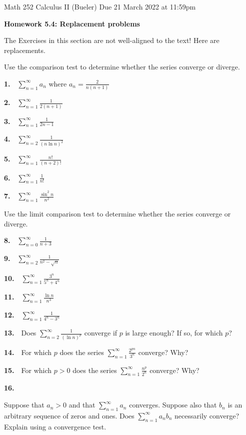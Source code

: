 \documentclass[12pt]{amsart}
\newcommand{\ds}{\displaystyle}
\begin{document}
\scriptsize \noindent Math 252 Calculus II (Bueler) \hfill Due 21 March 2022 at 11:59pm
\normalsize

\Large
\bigskip
\centerline{\textbf{Homework 5.4: Replacement problems}}
\medskip
\normalsize

\thispagestyle{empty}

\bigskip

The Exercises in this section are not well-aligned to the text!  Here are replacements.

\bigskip
\noindent Use the comparison test to determine whether the series converge or diverge.

\newcommand{\pr}[1]{\bigskip \textbf{#1.} \,\,}

\pr{1} $\ds \sum_{n=1}^\infty a_n$ where $\ds a_n = \frac{2}{n(n+1)}$

\pr{2} $\ds \sum_{n=1}^\infty \frac{1}{2(n+1)}$

\pr{3} $\ds \sum_{n=1}^\infty \frac{1}{2n - 1}$

\pr{4} $\ds \sum_{n=2}^\infty \frac{1}{(n\ln n)^2}$

\pr{5} $\ds \sum_{n=1}^\infty \frac{n!}{(n+2)!}$

\pr{6} $\ds \sum_{n=1}^\infty \frac{1}{n!}$

\pr{7} $\ds \sum_{n=1}^\infty \frac{\sin^2 n}{n^2}$

\bigskip
\noindent Use the limit comparison test to determine whether the series converge or diverge.

\pr{8} $\ds \sum_{n=0}^\infty \frac{1}{n+3}$

\pr{9} $\ds \sum_{n=2}^\infty \frac{1}{n^2 - \sqrt{n}}$

\pr{10} $\ds \sum_{n=1}^\infty \frac{3^n}{5^n + 4^n}$

\pr{11} $\ds \sum_{n=1}^\infty \frac{\ln n}{n^3}$

\pr{12} $\ds \sum_{n=1}^\infty \frac{1}{4^n - 3^n}$

\bigskip
\pr{13} Does $\ds \sum_{n=2}^\infty \frac{1}{(\ln n)^p}$ converge if $p$ is large enough?  If so, for which $p$?

\pr{14} For which $p$ does the series $\ds \sum_{n=1}^\infty \frac{2^{pn}}{3^n}$ converge?  Why?

\pr{15} For which $p>0$ does the series $\ds \sum_{n=1}^\infty \frac{n^p}{2^n}$ converge?  Why?

\pr{16} \begin{minipage}[t]{5.5in} Suppose that $a_n>0$ and that $\ds \sum_{n=1}^\infty a_n$ converges.  Suppose also that $b_n$ is an arbitrary sequence of zeros and ones. Does $\ds \sum_{n=1}^\infty a_n b_n$ necessarily converge?  Explain using a convergence test. \end{minipage}
\end{document}
